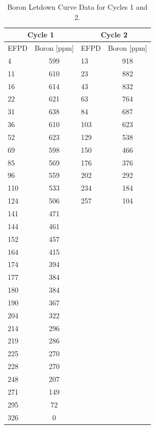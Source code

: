 \begin{table}[htp]
  \centering
  \caption{Boron Letdown Curve Data for Cycles 1 and 2.\label{tab:boron_letdown}}
  \begin{tabular}{l c l c}
    \toprule
    \multicolumn{2}{c}{Cycle 1} &
    \multicolumn{2}{c}{Cycle 2}\\
    \midrule
    \midrule
    \acs{EFPD} & Boron [\acs{ppm}] &  \acs{EFPD} & Boron [\acs{ppm}] \\
    4  & 599 & 13 & 918 \\
    11 & 610 & 23 & 882 \\
    16 & 614 & 43 & 832 \\
    22 & 621 & 63 & 764 \\
    31 & 638 & 84 & 687 \\
    36 & 610 & 103 & 623 \\
    52 & 623 & 129 & 538 \\
    69 & 598 & 150 & 466 \\
    85 & 569 & 176 & 376 \\
    96 & 559 & 202 & 292 \\
   110 & 533 & 234 & 184 \\
   124 & 506 & 257 & 104 \\
   141 & 471 & & \\
   144 & 461 & & \\ 
   152 & 457 &  & \\
   164 & 415 &  & \\
   174 & 394 &  & \\
   177 & 384 &  & \\
   180 & 384 &  & \\
   190 & 367 &  & \\
   204 & 322 &  & \\
   214 & 296 &  & \\
   219 & 286 &  & \\
   225 & 270 &  & \\
   228 & 270 &  & \\
   248 & 207 & & \\
   271 & 149 &  & \\
   295 & 72 &  & \\
   326 & 0 &  & \\
   \bottomrule
  \end{tabular}
\end{table} 
\clearpage
